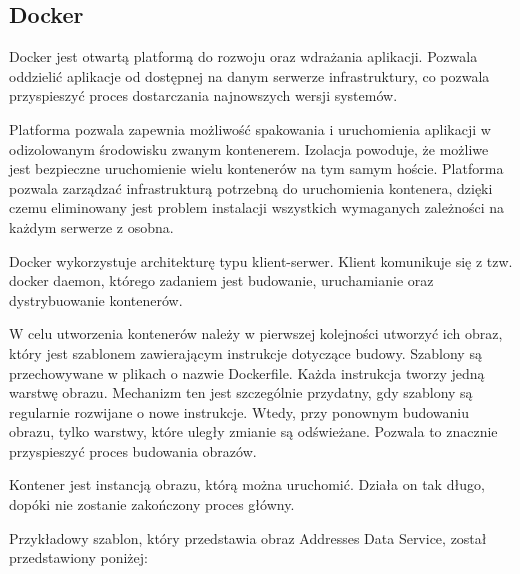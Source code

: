 \documentclass[11pt, a4]{article} %
\begin{document}
\subsection{Docker}

Docker jest otwartą platformą do rozwoju oraz wdrażania aplikacji. Pozwala oddzielić aplikacje od
dostępnej na danym serwerze infrastruktury, co pozwala przyspieszyć proces dostarczania najnowszych
wersji systemów. 

Platforma pozwala zapewnia możliwość spakowania i uruchomienia aplikacji w odizolowanym środowisku
zwanym kontenerem. Izolacja powoduje, że możliwe jest bezpieczne uruchomienie wielu kontenerów na tym
samym hoście. Platforma pozwala zarządzać infrastrukturą potrzebną do uruchomienia kontenera, dzięki
czemu eliminowany jest problem instalacji wszystkich wymaganych zależności na każdym serwerze z osobna.

Docker wykorzystuje architekturę typu klient-serwer. Klient komunikuje się z tzw. docker daemon, którego
zadaniem jest budowanie, uruchamianie oraz dystrybuowanie kontenerów. 

W celu utworzenia kontenerów należy w pierwszej kolejności utworzyć ich obraz, który jest szablonem
zawierającym instrukcje dotyczące budowy. Szablony są przechowywane w plikach o nazwie Dockerfile.
Każda instrukcja tworzy jedną warstwę obrazu. Mechanizm ten jest szczególnie przydatny, gdy szablony są
regularnie rozwijane o nowe instrukcje. Wtedy, przy ponownym budowaniu obrazu, tylko warstwy, które
uległy zmianie są odświeżane. Pozwala to znacznie przyspieszyć proces budowania obrazów.

Kontener jest instancją obrazu, którą można uruchomić. Działa on tak długo, dopóki nie zostanie
zakończony proces główny.

Przykładowy szablon, który przedstawia obraz Addresses Data Service, został przedstawiony poniżej:
\end{document}
